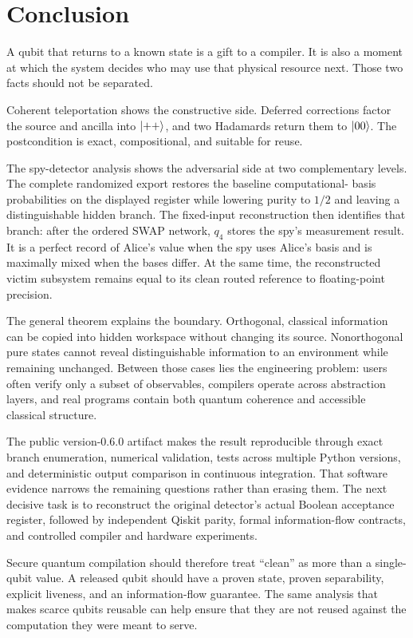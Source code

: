 \section{Conclusion}
\label{sec:conclusion}

A qubit that returns to a known state is a gift to a compiler. It is also a
moment at which the system decides who may use that physical resource next.
Those two facts should not be separated.

Coherent teleportation shows the constructive side. Deferred corrections factor
the source and ancilla into $\ket{++}$, and two Hadamards return them to
$\ket{00}$. The postcondition is exact, compositional, and suitable for reuse.

The spy-detector analysis shows the adversarial side at two complementary
levels. The complete randomized export restores the baseline computational-
basis probabilities on the displayed register while lowering purity to $1/2$
and leaving a distinguishable hidden branch. The fixed-input reconstruction then
identifies that branch: after the ordered SWAP network, $q_4$ stores the spy's
measurement result. It is a perfect record of Alice's value when the spy uses
Alice's basis and is maximally mixed when the bases differ. At the same time,
the reconstructed victim subsystem remains equal to its clean routed reference
to floating-point precision.

The general theorem explains the boundary. Orthogonal, classical information
can be copied into hidden workspace without changing its source. Nonorthogonal
pure states cannot reveal distinguishable information to an environment while
remaining unchanged. Between those cases lies the engineering problem: users
often verify only a subset of observables, compilers operate across abstraction
layers, and real programs contain both quantum coherence and accessible
classical structure.

The public version-0.6.0 artifact makes the result reproducible through exact
branch enumeration, numerical validation, tests across multiple Python
versions, and deterministic output comparison in continuous integration. That
software evidence narrows the remaining questions rather than erasing them. The
next decisive task is to reconstruct the original detector's actual Boolean
acceptance register, followed by independent Qiskit parity, formal
information-flow contracts, and controlled compiler and hardware experiments.

Secure quantum compilation should therefore treat ``clean'' as more than a
single-qubit value. A released qubit should have a proven state, proven
separability, explicit liveness, and an information-flow guarantee. The same
analysis that makes scarce qubits reusable can help ensure that they are not
reused against the computation they were meant to serve.
